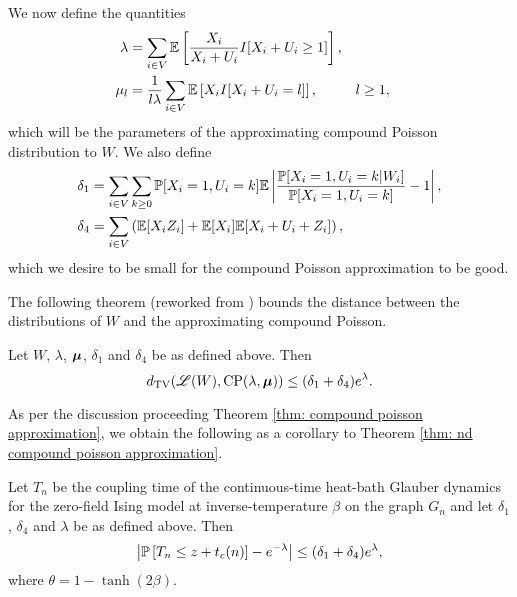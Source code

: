 	We now define the quantities
	\begin{align}
		\lambda &= \sum_{i \in V} \mathbb{E}\left[\frac{X_i}{X_i + U_i} I[ X_i + U_i \geq 1] \right],\\
		\mu_l &= \frac{1}{l \lambda} \sum_{i \in V} \mathbb{E}\left[ X_i I[X_i + U_i = l] \right], && l\geq 1,
	\end{align}
	which will be the parameters of the approximating compound Poisson distribution to $W$. We also define
	\begin{align}
		\delta_1 &= \sum_{i \in V}  \sum_{k \geq 0} \mathbb{P}[X_i = 1, U_i = k] \mathbb{E} \left|\frac{\mathbb{P}[X_i = 1, U_i = k|W_i]}{\mathbb{P}[X_i = 1, U_i = k]} - 1 \right|, \label{eq:delta1 nD}\\ 
		\delta_4 &= \sum_{i \in V} \left( \mathbb{E}[X_i Z_i] + \mathbb{E}[X_i] \mathbb{E}[X_i + U_i + Z_i] \right), \label{eq:delta4 nD}
	\end{align}
	which we desire to be small for the compound Poisson approximation to be good.

	The following theorem (reworked from \cite{Barbour2001-nh}) bounds the distance between the distributions of $W$ and the approximating compound Poisson.

	\begin{theorem}
	\label{thm: nd compound poisson approximation}
		Let $W$, $\lambda$, ${\bm{{\mu}}}$, $\delta_1$ and $\delta_4$ be as defined above. Then
		\begin{equation}
			d_{\mathrm{TV}}(\mathscr{L}(W), \mathrm{CP}(\lambda, {\bm{{\mu}}})) \leq (\delta_1 + \delta_4)e^\lambda.
		\end{equation}
	\end{theorem}
	As per the discussion proceeding Theorem \ref{thm: compound poisson approximation}, we obtain the following as a corollary to Theorem \ref{thm: nd compound poisson approximation}.
	\begin{corollary}
		\label{cor:nd bound distance prob[w=0] and e^-lambda}
		Let $T_n$ be the coupling time of the continuous-time heat-bath Glauber dynamics for the zero-field Ising model at inverse-temperature $\beta$ on the graph $G_n$ and let $\delta_1$, $\delta_4$ and $\lambda$ be as defined above. Then
		\begin{equation}
			\left|\mathbb{P}\left[T_n \leq z + t_c(n)\right] - e^{-\lambda}\right| \leq (\delta_1 + \delta_4)e^\lambda,
			\label{eq:nd bound distance prob[w=0] and e^-lambda}
		\end{equation}
		where $\theta = 1 - \tanh(2\beta)$.
	\end{corollary}


